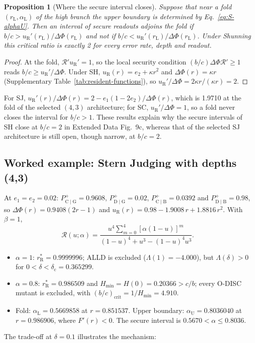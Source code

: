 \documentclass[fleqn,10pt]{article}
\theoremstyle{plain}
\newtheorem{proposition}{Proposition}
\theoremstyle{remark}
\newcommand{\EDSecurity}{9}
\newcommand{\Rm}{\mathcal R}
\newcommand{\Pp}[2]{P^+_{\mathrm{#1}\mid\mathrm{#2}}}
\newcommand{\rR}{r^*_{\mathrm R}}
\begin{document}
\begin{proposition}[Where the secure interval closes]\label{prop:closure}
Suppose that near a fold $(r_{\mathrm L},\alpha_{\mathrm L})$ of the high branch the
upper boundary is determined by Eq.~\eqref{eq:S-alphaU}. Then an interval of
secure readouts adjoins the fold if $b/c>u_{\mathrm R}'(r_{\mathrm L})/\Delta\Phi(r_{\mathrm L})$
and not if $b/c<u_{\mathrm R}'(r_{\mathrm L})/\Delta\Phi(r_{\mathrm L})$. Under Shunning
this critical ratio is exactly 2 for every error rate, depth and readout.
\end{proposition}
\begin{proof}
At the fold, $\Rm'u_{\mathrm R}'=1$, so the local security condition
$(b/c)\Delta\Phi\Rm'\ge1$ reads $b/c\ge u_{\mathrm R}'/\Delta\Phi$. Under SH,
$u_{\mathrm R}(r)=e_2+\kappa r^2$ and $\Delta\Phi(r)=\kappa r$
(Supplementary Table~\ref{tab:resident-functions}), so
$u_{\mathrm R}'/\Delta\Phi=2\kappa r/(\kappa r)=2$.
\end{proof}
For SJ, $u_{\mathrm R}'(r)/\Delta\Phi(r)=2-e_1(1-2e_2)/\Delta\Phi(r)$, which is
1.9710 at the fold of the selected $(4,3)$ architecture; for SC,
$u_{\mathrm R}'/\Delta\Phi=1$, so a fold never closes the interval for $b/c>1$.
These results explain why the secure intervals of SH close at $b/c=2$ in
Extended Data Fig.~\EDSecurity c, whereas that of the selected SJ architecture
is still open, though narrow, at $b/c=2$.

\subsection{Worked example: Stern Judging with depths (4,3)}
At $e_1=e_2=0.02$: $\Pp CG=0.9608$, $\Pp DG=0.02$, $\Pp CB=0.0392$ and
$\Pp DB=0.98$, so $\Delta\Phi(r)=0.9408(2r-1)$ and
$u_{\mathrm R}(r)=0.98-1.9008\,r+1.8816\,r^2$. With $\beta=1$,
\[
\Rm(u;\alpha)=\frac{u^4\sum_{m=0}^{4}[\alpha(1-u)]^m}{(1-u)^4+u^3-(1-u)^4u^3}.
\]
\begin{itemize}
\item $\alpha=1$: $\rR=0.9999996$; ALLD is excluded ($\Lambda(1)=-4.000$), but
$\Lambda(\delta)>0$ for $0<\delta<\delta_{\mathrm c}=0.365299$.
\item $\alpha=0.8$: $\rR=0.986509$ and $H_{\min}=H(0)=0.20366>c/b$; every O-DISC
mutant is excluded, with $(b/c)_{\mathrm{crit}}=1/H_{\min}=4.910$.
\item Fold: $\alpha_{\mathrm L}=0.5669858$ at $r=0.851537$. Upper boundary:
$\alpha_{\mathrm U}=0.8036040$ at $r=0.986906$, where $F'(r)<0$. The secure
interval is $0.5670<\alpha\le0.8036$.
\end{itemize}
The trade-off at $\delta=0.1$ illustrates the mechanism:
\end{document}
